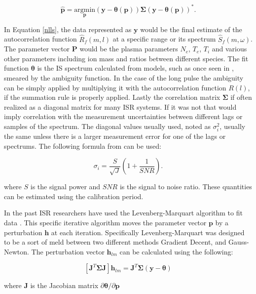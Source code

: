 \documentclass[10pt]{report}
\begin{document}
\begin{equation}
	\hat{\mathbf{p}}= \underset{\mathbf{p}}{\text{argmin}} (\mathbf{y}-\bm{\theta}(\mathbf{p}))\bm{\Sigma}(\mathbf{y}-\bm{\theta}(\mathbf{p}))^*.
\label{nlls}
\end{equation}

In Equation \ref{nlls}, the data represented as $\mathbf{y}$ would be the final estimate of the autocorrelation function $\hat{R}_f(m,l)$ at a specific range or its spectrum $\hat{S}_f(m,\omega)$.  The parameter vector $\mathbf{P}$ would be the plasma parameters $N_e$, $T_e$, $T_i$ and various other parameters including ion mass and ratios between different species.  The fit function $\bm{\theta}$ is the IS spectrum calculated from models, such as once seen in \cite{kudeki:milla:1}, smeared by the ambiguity function.  In the case of the long pulse the ambiguity can be simply applied by multiplying it with the autocorrelation function $R(l)$, if the summation rule is properly applied.  Lastly the correlation matrix $\bm{\Sigma}$ if often realized as a diagonal matrix for many ISR systems.  If it was not that would imply correlation with the measurement uncertainties between different lags or samples of the spectrum.  The diagonal values usually used, noted as $\sigma_i^2$, usually the same unless there is a larger measurement error for one of the lags or spectrums.  The following formula from  \cite{nicollsisrschool2013} can be used:

\begin{equation}
\label{sigpow}
\sigma_i = \frac{S}{\sqrt{J}}\left(1+\frac{1}{SNR}\right).
\end{equation}

\noindent where $S$ is the signal power and $SNR$ is the signal to noise ratio.  These quantities can be estimated using the calibration period.


In the past ISR researchers have used the Levenberg-Marquart algorithm to fit data \cite{nikoukar2008}.  This specific iterative algorithm moves the parameter vector $\mathbf{p}$ by a perturbation $\mathbf{h}$ at each iteration\cite{gavin:2013}.  Specifically Levenberg-Marquart was designed to be a sort of meld between two different methods Gradient Decent, and Gauss-Newton.  The perturbation vector $\mathbf{h}_{lm}$ can be calculated using the following:

\begin{equation}
\left[ \mathbf{J}^T\bm{\Sigma}\mathbf{J}\right]\mathbf{h}_{lm} =\mathbf{J}^T\bm{\Sigma}(\mathbf{y}-\bm{\theta})
\label{hlm}
\end{equation}

\noindent where $\mathbf{J}$ is the Jacobian matrix $\partial \bm{\theta}/\partial \mathbf{p}$ \cite{levenberg1944} \cite{marquardt:1963}


 

 

 
\end{document}

